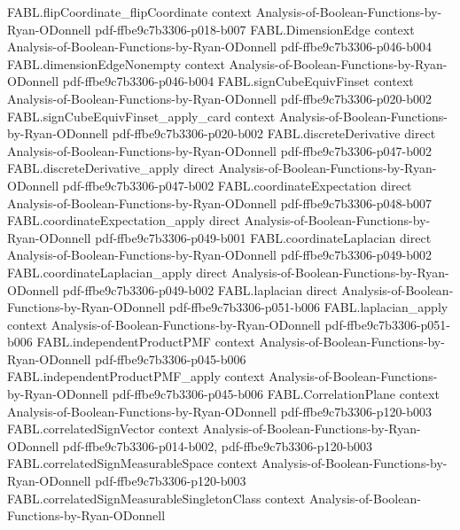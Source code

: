 \begin{theorem}
\proofstep
  {FABL.flipCoordinate_flipCoordinate}
  {context}
  {Analysis-of-Boolean-Functions-by-Ryan-ODonnell}
  {pdf-ffbe9c7b3306-p018-b007}
\proofstep
  {FABL.DimensionEdge}
  {context}
  {Analysis-of-Boolean-Functions-by-Ryan-ODonnell}
  {pdf-ffbe9c7b3306-p046-b004}
\proofstep
  {FABL.dimensionEdgeNonempty}
  {context}
  {Analysis-of-Boolean-Functions-by-Ryan-ODonnell}
  {pdf-ffbe9c7b3306-p046-b004}
\proofstep
  {FABL.signCubeEquivFinset}
  {context}
  {Analysis-of-Boolean-Functions-by-Ryan-ODonnell}
  {pdf-ffbe9c7b3306-p020-b002}
\proofstep
  {FABL.signCubeEquivFinset_apply_card}
  {context}
  {Analysis-of-Boolean-Functions-by-Ryan-ODonnell}
  {pdf-ffbe9c7b3306-p020-b002}
\proofstep
  {FABL.discreteDerivative}
  {direct}
  {Analysis-of-Boolean-Functions-by-Ryan-ODonnell}
  {pdf-ffbe9c7b3306-p047-b002}
\proofstep
  {FABL.discreteDerivative_apply}
  {direct}
  {Analysis-of-Boolean-Functions-by-Ryan-ODonnell}
  {pdf-ffbe9c7b3306-p047-b002}
\proofstep
  {FABL.coordinateExpectation}
  {direct}
  {Analysis-of-Boolean-Functions-by-Ryan-ODonnell}
  {pdf-ffbe9c7b3306-p048-b007}
\proofstep
  {FABL.coordinateExpectation_apply}
  {direct}
  {Analysis-of-Boolean-Functions-by-Ryan-ODonnell}
  {pdf-ffbe9c7b3306-p049-b001}
\proofstep
  {FABL.coordinateLaplacian}
  {direct}
  {Analysis-of-Boolean-Functions-by-Ryan-ODonnell}
  {pdf-ffbe9c7b3306-p049-b002}
\proofstep
  {FABL.coordinateLaplacian_apply}
  {direct}
  {Analysis-of-Boolean-Functions-by-Ryan-ODonnell}
  {pdf-ffbe9c7b3306-p049-b002}
\proofstep
  {FABL.laplacian}
  {direct}
  {Analysis-of-Boolean-Functions-by-Ryan-ODonnell}
  {pdf-ffbe9c7b3306-p051-b006}
\proofstep
  {FABL.laplacian_apply}
  {context}
  {Analysis-of-Boolean-Functions-by-Ryan-ODonnell}
  {pdf-ffbe9c7b3306-p051-b006}
\proofstep
  {FABL.independentProductPMF}
  {context}
  {Analysis-of-Boolean-Functions-by-Ryan-ODonnell}
  {pdf-ffbe9c7b3306-p045-b006}
\proofstep
  {FABL.independentProductPMF_apply}
  {context}
  {Analysis-of-Boolean-Functions-by-Ryan-ODonnell}
  {pdf-ffbe9c7b3306-p045-b006}
\proofstep
  {FABL.CorrelationPlane}
  {context}
  {Analysis-of-Boolean-Functions-by-Ryan-ODonnell}
  {pdf-ffbe9c7b3306-p120-b003}
\proofstep
  {FABL.correlatedSignVector}
  {context}
  {Analysis-of-Boolean-Functions-by-Ryan-ODonnell}
  {pdf-ffbe9c7b3306-p014-b002,
    pdf-ffbe9c7b3306-p120-b003}
\proofstep
  {FABL.correlatedSignMeasurableSpace}
  {context}
  {Analysis-of-Boolean-Functions-by-Ryan-ODonnell}
  {pdf-ffbe9c7b3306-p120-b003}
\proofstep
  {FABL.correlatedSignMeasurableSingletonClass}
  {context}
  {Analysis-of-Boolean-Functions-by-Ryan-ODonnell}

\end{theorem}
